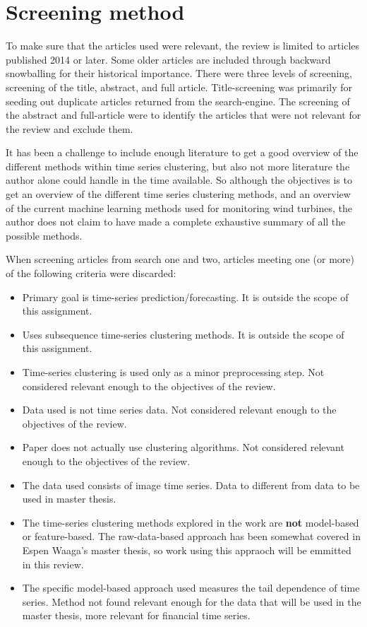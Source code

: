 \section{Screening method}
To make sure that the articles used were relevant, the review is limited to articles published 2014 or later. Some older articles are included through backward snowballing for their historical importance. There were three levels of screening, screening of the title, abstract, and full article. Title-screening was primarily for seeding out duplicate articles returned from the search-engine. The screening of the abstract and full-article were to identify the articles that were not relevant for the review and exclude them. \bigskip

It has been a challenge to include enough literature to get a good overview of the different methods within time series clustering, but also not more literature the author alone could handle in the time available. So although the objectives is to get an overview of the different time series clustering methods, and an overview of the current machine learning methods used for monitoring wind turbines, the author does not claim to have made a complete exhaustive summary of all the possible methods. \bigskip

When screening articles from search one and two, articles meeting one (or more) of the following criteria were discarded: 
\begin{itemize}
    \item Primary goal is time-series prediction/forecasting. It is outside the scope of this assignment.
    \item Uses subsequence time-series clustering methods. It is outside the scope of this assignment.
    \item Time-series clustering is used only as a minor preprocessing step. Not considered relevant enough to the objectives of the review.
    \item Data used is not time series data. Not considered relevant enough to the objectives of the review.
    \item Paper does not actually use clustering algorithms. Not considered relevant enough to the objectives of the review.
    \item The data used consists of image time series. Data to different from data to be used in master thesis.
    \item The time-series clustering methods explored in the work are \textbf{not} model-based or feature-based. The raw-data-based approach has been somewhat covered in Espen Waaga's master thesis, so work using this appraoch will be emmitted in this review.
    \item The specific model-based approach used measures the tail dependence of time series. Method not found relevant enough for the data that will be used in the master thesis, more relevant for financial time series.
\end{itemize}

